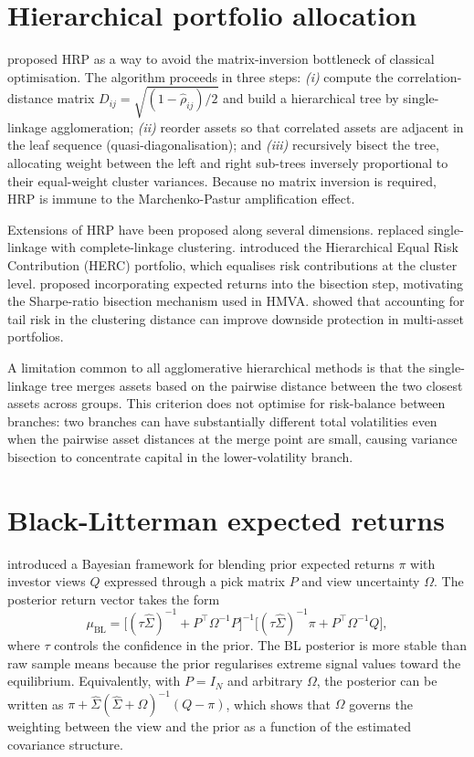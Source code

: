 \documentclass[a4paper,12pt]{report}
\newcommand{\muBL}{\mu_{\mathrm{BL}}}
\begin{document}
\section{Hierarchical portfolio allocation}
\label{sec:lit-hrp}

\citet{lopezdeprado2016} proposed HRP as a way to avoid the matrix-inversion
bottleneck of classical optimisation. The algorithm proceeds in three steps:
\textit{(i)} compute the correlation-distance matrix
$D_{ij} = \sqrt{(1-\hat{\rho}_{ij})/2}$ and build a hierarchical tree by
single-linkage agglomeration; \textit{(ii)} reorder assets so that correlated
assets are adjacent in the leaf sequence (quasi-diagonalisation); and
\textit{(iii)} recursively bisect the tree, allocating weight between the
left and right sub-trees inversely proportional to their equal-weight cluster
variances. Because no matrix inversion is required, HRP is immune to the
Marchenko-Pastur amplification effect.

Extensions of HRP have been proposed along several dimensions.
\citet{raffinot2017} replaced single-linkage with complete-linkage clustering.
\citet{raffinot2018} introduced the Hierarchical Equal Risk Contribution
(HERC) portfolio, which equalises risk contributions at the cluster level.
\citet{molyboga2020} proposed incorporating expected returns into the bisection
step, motivating the Sharpe-ratio bisection mechanism used in HMVA.
\citet{lohre2020} showed that accounting for tail risk in the clustering
distance can improve downside protection in multi-asset portfolios.

A limitation common to all agglomerative hierarchical methods is that the
single-linkage tree merges assets based on the pairwise distance between the
two closest assets across groups. This criterion does not optimise for
risk-balance between branches: two branches can have substantially different
total volatilities even when the pairwise asset distances at the merge point
are small, causing variance bisection to concentrate capital in the
lower-volatility branch.

\section{Black-Litterman expected returns}
\label{sec:lit-bl}

\citet{blacklitterman1992} introduced a Bayesian framework for blending
prior expected returns $\pi$ with investor views $Q$ expressed through a
pick matrix $P$ and view uncertainty $\Omega$. The posterior return vector
takes the form
\begin{equation}
  \muBL = \bigl[(\tau\hat{\Sigma})^{-1} + P^{\top}\Omega^{-1}P\bigr]^{-1}
          \bigl[(\tau\hat{\Sigma})^{-1}\pi + P^{\top}\Omega^{-1}Q\bigr],
  \label{eq:bl}
\end{equation}
where $\tau$ controls the confidence in the prior. The BL posterior is more
stable than raw sample means because the prior regularises extreme
signal values toward the equilibrium. Equivalently, with $P = I_N$ and
arbitrary $\Omega$, the posterior can be written as
$\pi + \hat{\Sigma}(\hat{\Sigma}+\Omega)^{-1}(Q - \pi)$, which shows
that $\Omega$ governs the weighting between the view and the prior as a
function of the estimated covariance structure.
\end{document}
